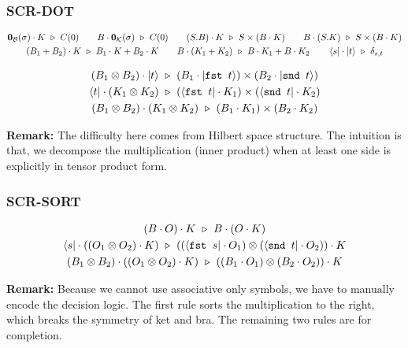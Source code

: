\documentclass[manuscript, review, timestamp]{acmart}
\newcommand*{\fst}{\texttt{fst }}
\newcommand*{\snd}{\texttt{snd }}
\newcommand*{\reduce}{\ \triangleright\ }
\begin{document}
\subsubsection*{\textsf{SCR-DOT}}
\begin{gather*}
  \mathbf{0}_\mathcal{B}(\sigma) \cdot K \reduce C(0)
  \qquad
  B \cdot \mathbf{0}_\mathcal{K}(\sigma) \reduce C(0)
  \qquad
  (S.B) \cdot K \reduce S \times (B \cdot K)
  \qquad
  B \cdot (S.K) \reduce S \times (B \cdot K) \\
  (B_1 + B_2) \cdot K \reduce B_1 \cdot K + B_2 \cdot K
  \qquad
  B \cdot (K_1 + K_2) \reduce B \cdot K_1 + B \cdot K_2
  \qquad
  \bra{s} \cdot \ket{t} \reduce \delta_{s, t} \\
\end{gather*}

\begin{gather*}
  (B_1 \otimes B_2) \cdot \ket{t} \reduce (B_1 \cdot \ket{\fst t}) \times (B_2 \cdot \ket{\snd t}) \\
  \bra{t} \cdot (K_1 \otimes K_2) \reduce (\bra{\fst t} \cdot K_1) \times (\bra{\snd t} \cdot K_2) \\
  (B_1 \otimes B_2) \cdot (K_1 \otimes K_2) \reduce (B_1 \cdot K_1) \times (B_2 \cdot K_2)
\end{gather*}

\textbf{Remark:} The difficulty here comes from Hilbert space structure. The intuition is that, we decompose the multiplication (inner product) when at least one side is explicitly in tensor product form.

\subsubsection*{\textsf{SCR-SORT}}
\begin{gather*}
  (B \cdot O) \cdot K \reduce B \cdot (O \cdot K) \\
  \bra{s} \cdot ((O_1 \otimes O_2) \cdot K) \reduce ((\bra{\fst s} \cdot O_1) \otimes (\bra{\snd t} \cdot O_2)) \cdot K \\
  (B_1 \otimes B_2) \cdot ((O_1 \otimes O_2) \cdot K) \reduce ((B_1 \cdot O_1) \otimes (B_2 \cdot O_2)) \cdot K \\
\end{gather*}


\textbf{Remark:} Because we cannot use associative only symbols, we have to manually encode the decision logic. The first rule sorts the multiplication to the right, which breaks the symmetry of ket and bra. The remaining two rules are for completion.
\end{document}
